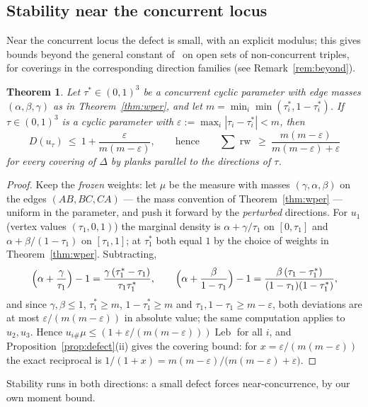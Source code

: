 \documentclass[11pt,reqno]{amsart}
\theoremstyle{plain}
\newtheorem{theorem}{Theorem}[section]
\theoremstyle{definition}
\theoremstyle{remark}
\newcommand{\rw}{\operatorname{rw}}
\newcommand{\Leb}{\operatorname{Leb}}
\begin{document}
\subsection*{Stability near the concurrent locus}
Near the concurrent locus the defect is small, with an explicit modulus; this
gives bounds beyond the general constant of~\cite{BY26} on open sets of
non-concurrent triples, for coverings in the corresponding direction families
(see Remark~\ref{rem:beyond}).

\begin{theorem}\label{thm:defectstab}
Let $\tau^*\in(0,1)^3$ be a concurrent cyclic parameter with edge masses
$(\alpha,\beta,\gamma)$ as in Theorem~\ref{thm:wper}, and let
$m=\min_i\min(\tau_i^*,1-\tau_i^*)$. If $\tau\in(0,1)^3$ is a cyclic parameter
with $\varepsilon:=\max_i|\tau_i-\tau_i^*|<m$, then
\[
D(u_\tau)\ \le\ 1+\frac{\varepsilon}{m(m-\varepsilon)},
\qquad\text{hence}\qquad
\sum\rw\ \ge\ \frac{m(m-\varepsilon)}{m(m-\varepsilon)+\varepsilon}
\]
for every covering of $\Delta$ by planks parallel to the directions of $\tau$.
\end{theorem}

\begin{proof}
Keep the \emph{frozen} weights: let $\mu$ be the measure with masses
$(\gamma,\alpha,\beta)$ on the edges $(AB,BC,CA)$ --- the mass convention of
Theorem~\ref{thm:wper} --- uniform in the parameter, and
push it forward by the \emph{perturbed} directions. For $u_1$ (vertex values
$(\tau_1,0,1)$) the marginal density is $\alpha+\gamma/\tau_1$ on $[0,\tau_1]$
and $\alpha+\beta/(1-\tau_1)$ on $[\tau_1,1]$; at $\tau_1^*$ both equal $1$ by
the choice of weights in Theorem~\ref{thm:wper}. Subtracting,
\[
\Bigl(\alpha+\frac{\gamma}{\tau_1}\Bigr)-1
=\frac{\gamma\,(\tau_1^*-\tau_1)}{\tau_1\tau_1^*},\qquad
\Bigl(\alpha+\frac{\beta}{1-\tau_1}\Bigr)-1
=\frac{\beta\,(\tau_1-\tau_1^*)}{(1-\tau_1)(1-\tau_1^*)},
\]
and since $\gamma,\beta\le1$, $\tau_1^*\ge m$, $1-\tau_1^*\ge m$ and
$\tau_1,1-\tau_1\ge m-\varepsilon$, both deviations are at most
$\varepsilon/(m(m-\varepsilon))$ in absolute value; the same computation applies
to $u_2,u_3$. Hence $u_{i\#}\mu\le(1+\varepsilon/(m(m-\varepsilon)))\Leb$ for
all $i$, and Proposition~\ref{prop:defect}(ii) gives the covering bound: for
$x=\varepsilon/(m(m-\varepsilon))$ the exact reciprocal is
$1/(1+x)=m(m-\varepsilon)/\bigl(m(m-\varepsilon)+\varepsilon\bigr)$.
\end{proof}

Stability runs in both directions: a small defect forces near-concurrence,
by our own moment bound.
\end{document}
